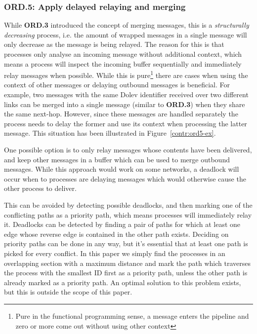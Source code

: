 \subsubsection{ORD.5: Apply delayed relaying and merging}
While \textbf{ORD.3} introduced the concept of merging messages, this is a \textit{structurally decreasing} process, i.e. the amount of wrapped messages in a single message will only decrease as the message is being relayed. The reason for this is that processes only analyse an incoming message without additional context, which means a process will inspect the incoming buffer sequentially and immediately relay messages when possible.
While this is pure\footnote{Pure in the functional programming sense, a message enters the pipeline and zero or more come out without using other context} 
there are cases when using the context of other messages or delaying outbound messages is beneficial. For example, two messages with the same Dolev identifier received over two different links can be merged into a single message (similar to \textbf{ORD.3}) when they share the same next-hop. However, since these messages are handled separately the process needs to delay the former and use its context when processing the latter message. This situation has been illustrated in Figure~\ref{contr:ord5-ex}.

One possible option is to only relay messages whose contents have been delivered, and keep other messages in a buffer which can be used to merge outbound messages. While this approach would work on some networks, a deadlock will occur when to processes are delaying messages which would otherwise cause the other process to deliver.



This can be avoided by detecting possible deadlocks, and then marking one of the conflicting paths as a priority path, which means processes will immediately relay it. Deadlocks can be detected by finding a pair of paths for which at least one edge whose reverse edge is contained in the other path exists. Deciding on priority paths can be done in any way, but it's essential that at least one path is picked for every conflict. In this paper we simply find the processes in an overlapping section with a maximum distance and mark the path which traverses the process with the smallest ID first as a priority path, unless the other path is already marked as a priority path. An optimal solution to this problem exists, but this is outside the scope of this paper.


